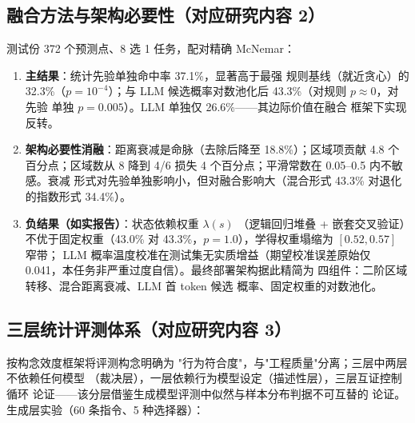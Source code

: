 \subsection{融合方法与架构必要性（对应研究内容 2）}

测试份 372 个预测点、8 选 1 任务，配对精确
McNemar\cite{mcnemar1947note}：

\begin{enumerate}
  \item \textbf{主结果}：统计先验单独命中率 37.1\%，显著高于最强
        规则基线（就近贪心）的 32.3\%（$p=10^{-4}$）；与 LLM
        候选概率对数池化后 43.3\%（对规则 $p\approx0$，对先验
        单独 $p=0.005$）。LLM 单独仅 26.6\%——其边际价值在融合
        框架下实现反转。
  \item \textbf{架构必要性消融}：距离衰减是命脉（去除后降至
        18.8\%）；区域项贡献 4.8 个百分点；区域数从 8 降到 4/6
        损失 4 个百分点；平滑常数在 0.05--0.5 内不敏感。衰减
        形式对先验单独影响小，但对融合影响大（混合形式 43.3\%
        对退化的指数形式 34.4\%）。
  \item \textbf{负结果（如实报告）}：状态依赖权重 $\lambda(s)$
        （逻辑回归堆叠 + 嵌套交叉验证）不优于固定权重（43.0\%
        对 43.3\%，$p=1.0$），学得权重塌缩为 $[0.52,0.57]$ 窄带；
        LLM 概率温度校准在测试集无实质增益（期望校准误差原始仅
        0.041，本任务非严重过度自信）。最终部署架构据此精简为
        四组件：二阶区域转移、混合距离衰减、LLM 首 token 候选
        概率、固定权重的对数池化。
\end{enumerate}

\subsection{三层统计评测体系（对应研究内容 3）}

按构念效度框架\cite{cronbach1955construct}将评测构念明确为
"行为符合度"，与"工程质量"分离；三层中两层不依赖任何模型
（裁决层），一层依赖行为模型设定（描述性层），三层互证控制循环
论证——该分层借鉴生成模型评测中似然与样本分布判据不可互替的
论证\cite{theis2016note}。生成层实验（60 条指令、5 种选择器）：

